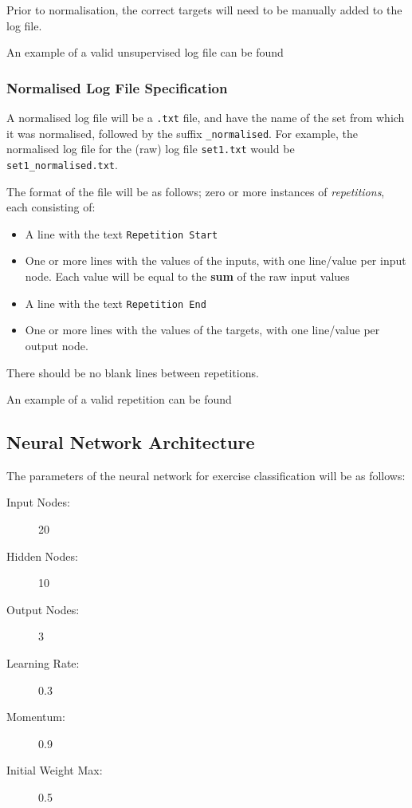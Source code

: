\documentclass[a4paper]{article}
\begin{document}
Prior to normalisation, the correct targets will need to be manually added to the log file.

An example of a valid unsupervised log file can be found 

\subsubsection{Normalised Log File Specification}

A normalised log file will be a \lstinline{.txt} file, and have the name of the set from which it was normalised, followed by the suffix \lstinline{_normalised}. For example, the normalised log file for the (raw) log file \lstinline{set1.txt} would be \lstinline{set1_normalised.txt}.

The format of the file will be as follows; zero or more instances of \emph{repetitions}, each consisting of:
\begin{itemize}
\item A line with the text \lstinline{Repetition Start}
\item One or more lines with the values of the inputs, with one line/value per input node. Each value will be equal to the \textbf{sum} of the raw input values
\item A line with the text \lstinline{Repetition End}
\item One or more lines with the values of the targets, with one line/value per output node.
\end{itemize}

There should be no blank lines between repetitions.

An example of a valid repetition can be found 

\subsection{Neural Network Architecture}%

The parameters of the neural network for exercise classification will be as follows:

\begin{description}
\item[Input Nodes: ] 20
\item[Hidden Nodes: ] 10
\item[Output Nodes: ] 3
\item[Learning Rate:] 0.3
\item[Momentum: ] 0.9
\item[Initial Weight Max: ] 0.5
\end{description}
\end{document}
